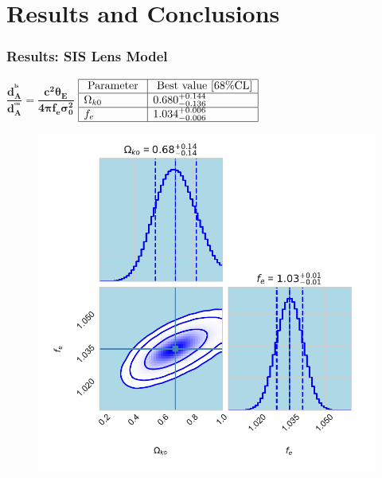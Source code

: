 \documentclass[xcolor=table,bigger]{beamer}
\begin{document}
\section{ Results and Conclusions}
\begin{frame}
 \frametitle{Results: \textbf{SIS} Lens Model}
 $
{\boxed{\boldsymbol{\dfrac{d_A^{^{ls}}}{d_A^{^{os}}}=\dfrac{c^2\theta_E}{4\pi f_e\sigma_{{0}}^2}}}}
$ \hspace*{2cm}$\begin{array}
 {|l|l|l|}\hline 
 \text { Parameter } & {\text { Best value }[68 \% \mathrm{CL}]} \\ \hline 
 \Omega_{k0} & {0.680^{+0.144}_{-0.136}} \\ \hline f_{e} & {1.034^{+0.006}_{-0.006}} \\ \hline
 \end{array}$
 \begin{figure}[ht!]
\centering
\includegraphics[width=60 mm]{distance_Ratio_161_ok_1_fe_corner_without_H0_dec}
\end{figure} 
 \end{frame}
\end{document}

